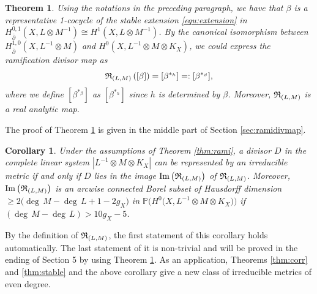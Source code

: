\documentclass[12pt]{article}
\newtheorem{thm}{Theorem}[section]
\newtheorem{cor}{Corollary}[section]
\begin{document}
\begin{thm}
\label{thm:expressionofR} Using the notations in the preceding paragraph, we have that
$\beta$ is a representative 1-cocycle of the stable extension \eqref{equ:extension} in $H^{0,1}_{\bar{\partial}}(X, L \otimes M^{-1}) \cong H^{1}(X, L \otimes M^{-1})$. By the canonical isomorphism between $H^{1,0}_{\bar{\partial}}(X, L^{-1} \otimes M)$ and $H^{0}(X, L^{-1} \otimes M \otimes K_{X})$, we could express the ramification divisor map as
\begin{equation}
\label{equ:rami}
{\frak R}_{(L, M)} \left( [\beta] \right) = [\beta^{*_{h}}]=:[\beta^{*_{\beta}}],
\end{equation}
where we define $[\beta^{*_{\beta}}]$ as $[\beta^{*_{h}}]$ since $h$ is determined by $\beta$.
Moreover, ${\frak R}_{(L, M)}$ is a real analytic map.%

\end{thm}

The proof of Theorem \ref{thm:expressionofR} is given in the middle part of Section \ref{sec:ramidivmap}.



\begin{cor}
\label{cor:image}
Under the assumptions of Theorem \ref{thm:rami}, a divisor $D$ in the complete linear system $\left| L^{-1} \otimes M \otimes K_{X} \right|$ can be represented by an irreducible metric if and only if $D$ lies in the image  $\operatorname{Im} \big({\frak R}_{(L, M)}\big)$ of ${\frak R}_{(L, M)}$. Moreover,
 $\operatorname{Im} \big({\frak R}_{(L, M)}\big)$ is an arcwise connected Borel subset of Hausdorff dimension $\geq 2\big(\deg\,M-\deg\, L+1-2g_X\big)$ in $\mathbb{P}\Big(H^{0}\big(X, L^{-1} \otimes M \otimes K_{X}\big)\Big)$ if $(\deg\, M-\deg\, L) > 10g_{X} - 5$.
\end{cor}


By the definition of ${\frak R}_{(L, M)}$, the first statement of this corollary holds automatically.  The last statement of it is non-trivial and will be proved in the ending of
Section 5 by using Theorem \ref{thm:expressionofR}.
As an application,  Theorems \ref{thm:corr} and \ref{thm:stable} and the above corollary give a new class of irreducible metrics of even degree.
\end{document}
